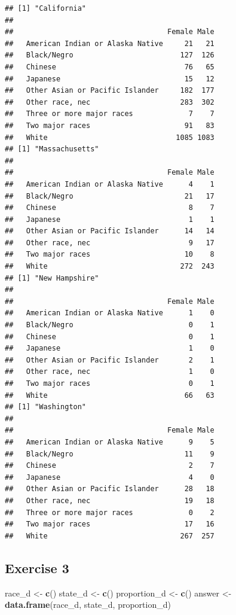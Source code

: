 \documentclass[]{book}
\newenvironment{Shaded}{\begin{snugshade}}{\end{snugshade}}
\newcommand{\KeywordTok}[1]{\textcolor[rgb]{0.13,0.29,0.53}{\textbf{#1}}}
\newcommand{\StringTok}[1]{\textcolor[rgb]{0.31,0.60,0.02}{#1}}
\newcommand{\NormalTok}[1]{#1}
\theoremstyle{definition}
\theoremstyle{definition}
\theoremstyle{definition}
\theoremstyle{remark}
\begin{document}
\begin{verbatim}
## [1] "California"
##                                   
##                                    Female Male
##   American Indian or Alaska Native     21   21
##   Black/Negro                         127  126
##   Chinese                              76   65
##   Japanese                             15   12
##   Other Asian or Pacific Islander     182  177
##   Other race, nec                     283  302
##   Three or more major races             7    7
##   Two major races                      91   83
##   White                              1085 1083
## [1] "Massachusetts"
##                                   
##                                    Female Male
##   American Indian or Alaska Native      4    1
##   Black/Negro                          21   17
##   Chinese                               8    7
##   Japanese                              1    1
##   Other Asian or Pacific Islander      14   14
##   Other race, nec                       9   17
##   Two major races                      10    8
##   White                               272  243
## [1] "New Hampshire"
##                                   
##                                    Female Male
##   American Indian or Alaska Native      1    0
##   Black/Negro                           0    1
##   Chinese                               0    1
##   Japanese                              1    0
##   Other Asian or Pacific Islander       2    1
##   Other race, nec                       1    0
##   Two major races                       0    1
##   White                                66   63
## [1] "Washington"
##                                   
##                                    Female Male
##   American Indian or Alaska Native      9    5
##   Black/Negro                          11    9
##   Chinese                               2    7
##   Japanese                              4    0
##   Other Asian or Pacific Islander      28   18
##   Other race, nec                      19   18
##   Three or more major races             0    2
##   Two major races                      17   16
##   White                               267  257
\end{verbatim}

\subsection*{Exercise 3}\label{exercise-3}

\begin{Shaded}
\begin{Highlighting}[]
\NormalTok{race_d <-}\StringTok{ }\KeywordTok{c}\NormalTok{()}
\NormalTok{state_d <-}\StringTok{ }\KeywordTok{c}\NormalTok{()}
\NormalTok{proportion_d <-}\StringTok{ }\KeywordTok{c}\NormalTok{()}
\NormalTok{answer <-}\StringTok{ }\KeywordTok{data.frame}\NormalTok{(race_d, state_d, proportion_d)}
\end{Highlighting}
\end{Shaded}
\end{document}
